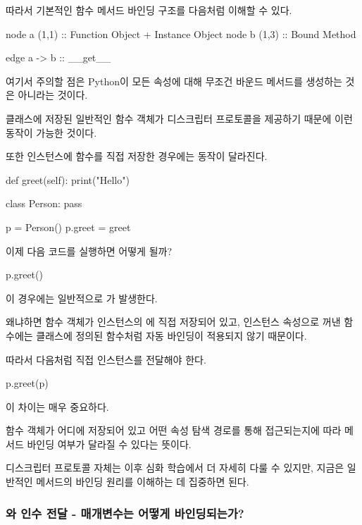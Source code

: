 따라서 기본적인 함수 메서드 바인딩 구조를 다음처럼 이해할 수 있다.

\begin{dhkdiagram}[in=2]
node a (1,1) :: Function Object + Instance Object
node b (1,3) :: Bound Method

edge a -> b :: __get__
\end{dhkdiagram}

여기서 주의할 점은 Python이 모든 속성에 대해 무조건 바운드 메서드를 생성하는 것은 아니라는 것이다.

클래스에 저장된 일반적인 함수 객체가 디스크립터 프로토콜을 제공하기 때문에 이런 동작이 가능한 것이다.

또한 인스턴스에 함수를 직접 저장한 경우에는 동작이 달라진다.

\begin{dhkcode}
def greet(self):
    print("Hello")

class Person:
    pass

p = Person()
p.greet = greet
\end{dhkcode}

이제 다음 코드를 실행하면 어떻게 될까?

\begin{dhkcode}
p.greet()
\end{dhkcode}

이 경우에는 일반적으로 가 발생한다.

왜냐하면  함수 객체가 인스턴스의 에 직접 저장되어 있고, 인스턴스 속성으로 꺼낸 함수에는 클래스에 정의된 함수처럼 자동 바인딩이 적용되지 않기 때문이다.

따라서 다음처럼 직접 인스턴스를 전달해야 한다.

\begin{dhkcode}
p.greet(p)
\end{dhkcode}

이 차이는 매우 중요하다.

함수 객체가 어디에 저장되어 있고 어떤 속성 탐색 경로를 통해 접근되는지에 따라 메서드 바인딩 여부가 달라질 수 있다는 뜻이다.

디스크립터 프로토콜 자체는 이후 심화 학습에서 더 자세히 다룰 수 있지만, 지금은 일반적인 메서드의 바인딩 원리를 이해하는 데 집중하면 된다.

\subsubsection{와 인수 전달 - 매개변수는 어떻게 바인딩되는가?}

